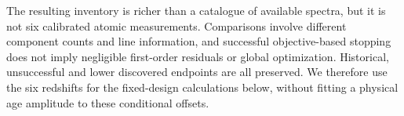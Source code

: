 The resulting inventory is richer than a catalogue of available spectra, but it is not six calibrated atomic measurements. Comparisons involve different component counts and line information, and successful objective-based stopping does not imply negligible first-order residuals or global optimization. Historical, unsuccessful and lower discovered endpoints are all preserved. We therefore use the six redshifts for the fixed-design calculations below, without fitting a physical age amplitude to these conditional offsets.
